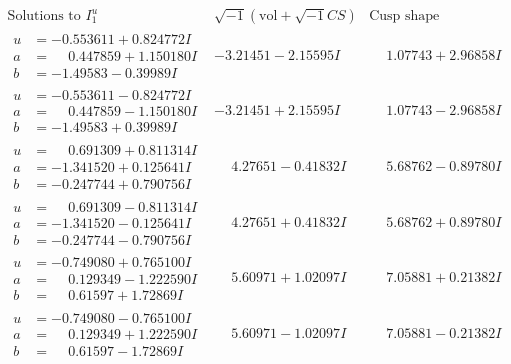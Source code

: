 \documentclass[1p]{elsarticle_modified}
\theoremstyle{definition}
\newcommand{\I}{\sqrt{-1}}
\begin{document}
$$\begin{array}{c|c|c}  
\text{Solutions to }I^u_{1}& \I (\text{vol} + \sqrt{-1}CS) & \text{Cusp shape}\\
 \hline 
\begin{aligned}
u &= -0.553611 + 0.824772 I \\
a &= \phantom{-}0.447859 + 1.150180 I \\
b &= -1.49583 - 0.39989 I\end{aligned}
 & -3.21451 - 2.15595 I & \phantom{-}1.07743 + 2.96858 I \\ \hline\begin{aligned}
u &= -0.553611 - 0.824772 I \\
a &= \phantom{-}0.447859 - 1.150180 I \\
b &= -1.49583 + 0.39989 I\end{aligned}
 & -3.21451 + 2.15595 I & \phantom{-}1.07743 - 2.96858 I \\ \hline\begin{aligned}
u &= \phantom{-}0.691309 + 0.811314 I \\
a &= -1.341520 + 0.125641 I \\
b &= -0.247744 + 0.790756 I\end{aligned}
 & \phantom{-}4.27651 - 0.41832 I & \phantom{-}5.68762 - 0.89780 I \\ \hline\begin{aligned}
u &= \phantom{-}0.691309 - 0.811314 I \\
a &= -1.341520 - 0.125641 I \\
b &= -0.247744 - 0.790756 I\end{aligned}
 & \phantom{-}4.27651 + 0.41832 I & \phantom{-}5.68762 + 0.89780 I \\ \hline\begin{aligned}
u &= -0.749080 + 0.765100 I \\
a &= \phantom{-}0.129349 - 1.222590 I \\
b &= \phantom{-}0.61597 + 1.72869 I\end{aligned}
 & \phantom{-}5.60971 + 1.02097 I & \phantom{-}7.05881 + 0.21382 I \\ \hline\begin{aligned}
u &= -0.749080 - 0.765100 I \\
a &= \phantom{-}0.129349 + 1.222590 I \\
b &= \phantom{-}0.61597 - 1.72869 I\end{aligned}
 & \phantom{-}5.60971 - 1.02097 I & \phantom{-}7.05881 - 0.21382 I \\ \hline\begin{aligned}

\end{aligned}
\end{array}$$
\end{document}

